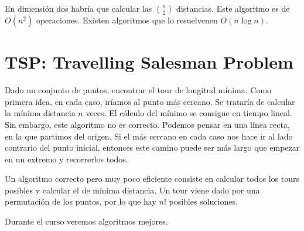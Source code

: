 \documentclass[AL.tex]{subfiles}
\begin{document}
En dimensión dos habría que calcular las $\binom{n}{2}$ distancias. Este algoritmo es de $O(n^2)$ operaciones. Existen algoritmos que lo resuelvenen $O(n\log n)$. 


\section{TSP: Travelling Salesman Problem}
Dado un conjunto de puntos, encontrar el tour de longitud mínima. Como primera idea, en cada caso, iríamos al punto más cercano. Se trataría de calcular la mínima distancia $n$ veces. El cálculo del mínimo se consigue en tiempo lineal. Sin embargo, este algoritmo no es correcto. Podemos pensar en una línea recta, en la que partimos del origen. Si el más cercano en cada caso nos hace ir al lado contrario del punto inicial, entonces este camino puede ser más largo que empezar en un extremo y recorrerlos todos. 


Un algoritmo correcto pero muy poco eficiente consiste en calcular todos los tours posibles y calcular el de mínima distancia. Un tour viene dado por una permutación de los puntos, por lo que hay $n!$ posibles soluciones. 

Durante el curso veremos algoritmos mejores.
\end{document}
